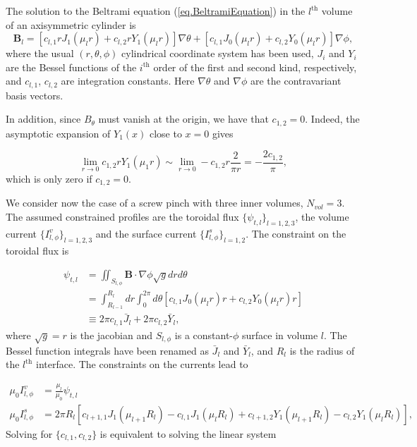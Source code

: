 The solution to the Beltrami equation (\ref{eq.BeltramiEquation}) in the $l^{\text{th}}$ volume of an axisymmetric cylinder is
	\begin{equation}
		\mathbf{B}_l = \left[c_{l,1}rJ_1(\mu_l r) + c_{l,2}rY_1(\mu_lr)\right] \nabla\theta + \left[c_{l,1}J_0(\mu_l r) + c_{l,2}Y_0(\mu_lr)\right] \nabla\phi,
\end{equation}
where the usual $(r,\theta,\phi)$ cylindrical coordinate system has been used, $J_i$ and $Y_i$ are the Bessel functions of the $i^\text{th}$ order of the first and second kind, respectively, and $c_{l,1}$, $c_{l,2}$ are integration constants. Here $\nabla\theta$ and $\nabla\phi$ are the contravariant basis vectors.

In addition, since $B_\theta$ must vanish at the origin, we have that $c_{1,2}=0$. Indeed, the asymptotic expansion of $Y_1(x)$ close to $x=0$ gives \citep{abramowitz_handbook_1964}

\begin{equation}
	\lim_{r\rightarrow 0} c_{1,2}rY_1(\mu_1 r) \sim \lim_{r\rightarrow 0} -c_{1,2}r\frac{2}{\pi r} = -\frac{2c_{1,2}}{\pi},
\end{equation}
which is only zero if $c_{1,2}=0$. 

We consider now the case of a screw pinch with three inner volumes, $N_{vol}=3$. The assumed constrained profiles are the toroidal flux $\{\psi_{t,l}\}_{l=1,2,3}$, the volume current $\{I^{v}_{l,\phi}\}_{l=1,2,3}$ and the surface current $\{I^{s}_{l,\phi}\}_{l=1,2}$. The constraint on the toroidal flux is

\begin{align}
	\psi_{t,l} &= \iint_{S_{l,\phi}} \mathbf{B}\cdot\nabla\phi \sqrt{g} dr d\theta\\
	&= \int_{R_{l-1}}^{R_l} dr \int_0^{2\pi} d\theta \left[ c_{l,1} J_0(\mu_l r) r + c_{l,2} Y_0(\mu_l r)r \right]\\
	&\equiv 2\pi c_{l,1} \bar{J}_l + 2\pi c_{l,2} \bar{Y}_l,
\end{align}
where $\sqrt{g}=r$ is the jacobian and $S_{l,\phi}$ is a constant-$\phi$ surface in volume $l$. The Bessel function integrals have been renamed as $\bar{J}_l$ and $\bar{Y}_l$, and $R_l$ is the radius of the $l^{\text{th}}$ interface. The constraints on the currents lead to

\begin{align}
	\mu_0I^{v}_{l,\phi} &= \frac{\mu_l}{\mu_0} \psi_{t,l}\\
	\mu_0I^{s}_{l,\phi} &= 2\pi R_l \left[ c_{l+1,1}J_1(\mu_{l+1}R_l) - c_{l,1}J_1(\mu_{l}R_l) + c_{l+1,2}Y_1(\mu_{l+1}R_l) -
	c_{l,2}Y_1(\mu_{l}R_l)\right],
\end{align}
Solving for $\{c_{l,1},c_{l,2}\}$ is equivalent to solving the linear system

